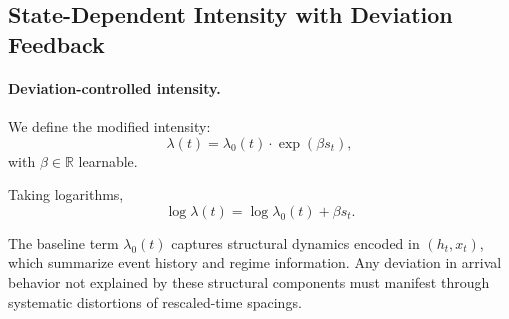 


\subsection{State-Dependent Intensity with Deviation Feedback}



\paragraph{Deviation-controlled intensity.}
We define the modified intensity:
%
\begin{equation}
\boxed{
\lambda(t)
=
\lambda_0(t)
\cdot
\exp(\beta s_t),
}
\label{eq:deviation_controlled_lambda2}
\end{equation}
%
with $\beta \in \mathbb{R}$ learnable.

Taking logarithms,
%
\begin{equation}
\log \lambda(t)
=
\log \lambda_0(t)
+
\beta s_t.
\label{eq:log_decomposition2}
\end{equation}


The baseline term $\lambda_0(t)$ captures structural dynamics encoded in $(h_t, x_t)$, which summarize event history and regime information. Any deviation in arrival behavior not explained by these structural components must manifest through systematic distortions of rescaled-time spacings.

